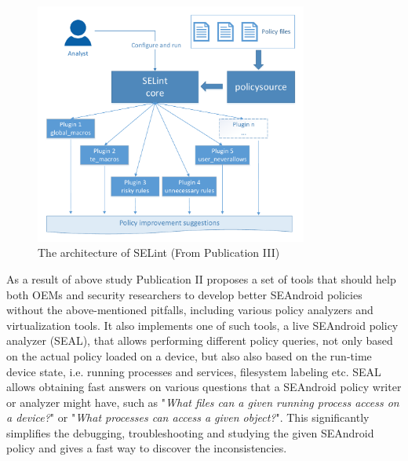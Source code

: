 \begin{figure}[t]
	\centering
		\includegraphics[width=0.80\textwidth]{figures/selint-archi.pdf}
	\caption{The architecture of SELint (From Publication III)}
	\label{fig:selint}
\end{figure}


As a result of above study Publication II proposes a set of tools that should help both OEMs and security researchers to develop better SEAndroid policies without the above-mentioned pitfalls, including various policy analyzers and virtualization tools. It also implements one of such tools, a live SEAndroid policy analyzer (SEAL), that allows performing different policy queries, not only based on the actual policy loaded on a device, but also also based on the run-time device state, i.e. running processes and services, filesystem labeling etc. SEAL allows obtaining fast answers on various questions that a SEAndroid policy writer or analyzer might have, such as "\textit{What files can a given running process access on a device?}" or "\textit{What processes can access a given object?}". This significantly simplifies the debugging, troubleshooting and studying the given SEAndroid policy and gives a fast way to discover the inconsistencies. 

